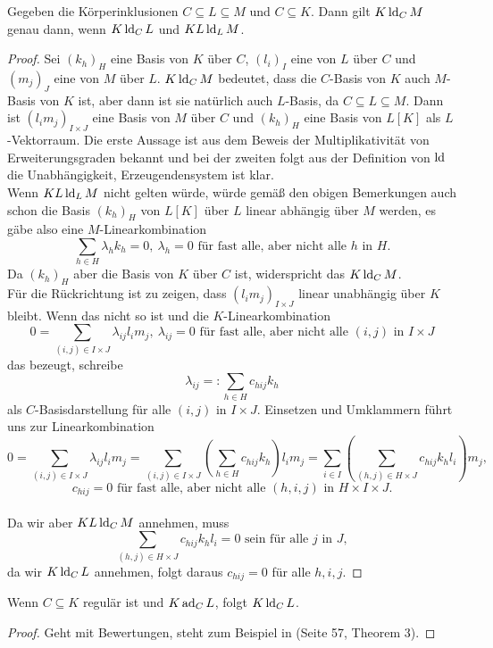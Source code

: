     \begin{lemma}\label{Stapellemma}
    	Gegeben die Körperinklusionen $C\subseteq L\subseteq M$ und $C\subseteq K$. Dann gilt $K\operatorname{ld}_CM$ genau dann, wenn $K\operatorname{ld}_CL$ und $KL\operatorname{ld}_LM$.
    \end{lemma}
    \begin{proof}
    	Sei $(k_h)_H$ eine Basis von $K$ über $C$, $(l_i)_I$ eine von $L$ über $C$ und $(m_j)_J$ eine von $M$ über $L$. $K\operatorname{ld}_CM$ bedeutet, dass die $C$-Basis von $K$ auch $M$-Basis von $K$ ist, aber dann ist sie natürlich auch $L$-Basis, da $C\subseteq L\subseteq M$. Dann ist $(l_im_j)_{I\times J}$ eine Basis von $M$ über $C$ und $(k_h)_H$ eine Basis von $L[K]$ als $L$-Vektorraum. Die erste Aussage ist aus dem Beweis der Multiplikativität von Erweiterungsgraden bekannt und bei der zweiten folgt aus der Definition von $\operatorname{ld}$ die Unabhängigkeit, Erzeugendensystem ist klar.\\
    	Wenn $KL\operatorname{ld}_LM$ nicht gelten würde, würde gemäß den obigen Bemerkungen auch schon die Basis $(k_h)_H$ von $L[K]$ über $L$ linear abhängig über $M$ werden, es gäbe also eine $M$-Linearkombination $$\sum\limits_{h\in H}\lambda_hk_h=0,\ \lambda_h=0\text{ für fast alle, aber nicht alle } h\text{ in }H.$$
    	Da $(k_h)_H$ aber die Basis von $K$ über $C$ ist, widerspricht das $K\operatorname{ld}_CM$.\\
    	Für die Rückrichtung ist zu zeigen, dass $(l_im_j)_{I\times J}$ linear unabhängig über $K$ bleibt. Wenn das nicht so ist und die $K$-Linearkombination $$0=\sum\limits_{(i,j)\in I\times J}\lambda_{ij}l_im_j,\  \lambda_{ij}=0\text{ für fast alle, aber nicht alle } (i,j)\text{ in }I\times J$$ das bezeugt, schreibe $$\lambda_{ij}=:\sum\limits_{h\in H}c_{hij}k_h$$ als $C$-Basisdarstellung für alle $(i,j)$ in $I\times J$. Einsetzen und Umklammern führt uns zur Linearkombination $$0=\sum\limits_{(i,j)\in I\times J}\lambda_{ij}l_im_j=\sum\limits_{(i,j)\in I\times J}\left(\sum\limits_{h\in H} c_{hij}k_h\right)l_im_j=\sum\limits_{i\in I}\left(\sum\limits_{(h,j)\in H\times J}c_{hij}k_hl_i\right)m_j,$$ $$c_{hij}=0\text{ für fast alle, aber nicht alle } (h,i,j)\text{ in }H\times I\times J.$$\\
    	Da wir aber $KL\operatorname{ld}_CM$ annehmen, muss $$\sum\limits_{(h,j)\in H\times J}c_{hij}k_hl_i=0\text{ sein für alle }j\text{ in }J,$$ da wir $K\operatorname{ld}_CL$ annehmen, folgt daraus $c_{hij}=0$ für alle $h,i,j$.
    \end{proof}
    
    \begin{lemma}\label{Das komplizierte Lemma}
    	Wenn $C\subseteq K$ regulär ist und $K\operatorname{ad}_CL$, folgt $K\operatorname{ld}_CL$.
    \end{lemma}
    \begin{proof}
    	Geht mit Bewertungen, steht zum Beispiel in \cite{SergeLang} (Seite 57, Theorem 3).
    \end{proof}
    
